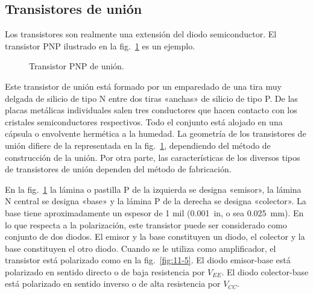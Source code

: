 \documentclass[a4paper,12pt]{article}
\begin{document}
\subsection{Transistores de unión}

Los transistores son realmente una extensión del diodo semiconductor. El transistor PNP ilustrado en
la fig.~\ref{fig:11-4} es un ejemplo.

\begin{figure}[h]
    \centering
    \caption{Transistor PNP de unión.}
    \label{fig:11-4}
\end{figure}

Este transistor de unión está formado por un emparedado de una tira muy delgada de silicio de tipo N
entre dos tiras «anchas» de silicio de tipo P. De las placas metálicas individuales salen tres conductores
que hacen contacto con los cristales semiconductores respectivos. Todo el conjunto está alojado en una
cápsula o envolvente hermética a la humedad. La geometría de los transistores de unión difiere de la
representada en la fig.~\ref{fig:11-4}, dependiendo del método de construcción de la unión. Por otra
parte, las características de los diversos tipos de transistores de unión dependen del método de fabricación.

En la fig.~\ref{fig:11-4} la lámina o pastilla P de la izquierda se designa «emisor», la lámina N central
se designa «base» y la lámina P de la derecha se designa «colector». La base tiene aproximadamente un espesor
de 1 mil (\SI{0.001}{in}, o sea \SI{0.025}{\mm}). En lo que respecta a la polarización, este transistor
puede ser considerado como conjunto de dos diodos. El emisor y la base constituyen un diodo, el colector y
la base constituyen el otro diodo. Cuando se le utiliza como amplificador, el transistor está polarizado
como en la fig.~\ref{fig:11-5}. El diodo emisor-base está polarizado en sentido directo o de baja
resistencia por \( V_{EE} \). El diodo colector-base está polarizado en sentido inverso o de alta resistencia
por \( V_{CC} \).
\end{document}
